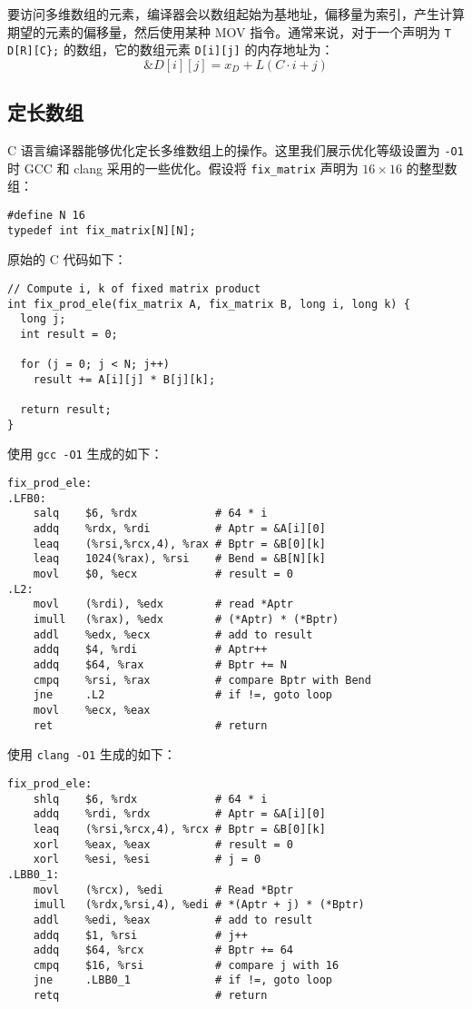 要访问多维数组的元素，编译器会以数组起始为基地址，偏移量为索引，产生计算期望的元素的偏移量，然后使用某种 MOV 指令。通常来说，对于一个声明为 \verb|T D[R][C};| 的数组，它的数组元素 \verb|D[i][j]| 的内存地址为：
\begin{equation}
    \&D[i][j] = x_D + L(C \cdot i + j)
    \label{def:2darray_addr}
\end{equation}

\subsection{定长数组}

C 语言编译器能够优化定长多维数组上的操作。这里我们展示优化等级设置为 \verb|-O1| 时 GCC 和 clang 采用的一些优化。假设将 \verb|fix_matrix| 声明为 $16 \times 16$ 的整型数组：
\begin{verbatim}
#define N 16
typedef int fix_matrix[N][N];
\end{verbatim}

原始的 C 代码如下：
\begin{verbatim}
// Compute i, k of fixed matrix product
int fix_prod_ele(fix_matrix A, fix_matrix B, long i, long k) {
  long j;
  int result = 0;

  for (j = 0; j < N; j++)
    result += A[i][j] * B[j][k];

  return result;
}
\end{verbatim}

使用 \verb|gcc -O1| 生成的如下：
\begin{verbatim}
fix_prod_ele:
.LFB0:
    salq    $6, %rdx            # 64 * i
    addq    %rdx, %rdi          # Aptr = &A[i][0]
    leaq    (%rsi,%rcx,4), %rax # Bptr = &B[0][k]
    leaq    1024(%rax), %rsi    # Bend = &B[N][k]
    movl    $0, %ecx            # result = 0
.L2:
    movl    (%rdi), %edx        # read *Aptr
    imull   (%rax), %edx        # (*Aptr) * (*Bptr)
    addl    %edx, %ecx          # add to result
    addq    $4, %rdi            # Aptr++
    addq    $64, %rax           # Bptr += N
    cmpq    %rsi, %rax          # compare Bptr with Bend
    jne     .L2                 # if !=, goto loop
    movl    %ecx, %eax
    ret                         # return
\end{verbatim}

使用 \verb|clang -O1| 生成的如下：
\begin{verbatim}
fix_prod_ele:
    shlq    $6, %rdx            # 64 * i
    addq    %rdi, %rdx          # Aptr = &A[i][0]
    leaq    (%rsi,%rcx,4), %rcx # Bptr = &B[0][k]
    xorl    %eax, %eax          # result = 0
    xorl    %esi, %esi          # j = 0
.LBB0_1:
    movl    (%rcx), %edi        # Read *Bptr
    imull   (%rdx,%rsi,4), %edi # *(Aptr + j) * (*Bptr)
    addl    %edi, %eax          # add to result
    addq    $1, %rsi            # j++
    addq    $64, %rcx           # Bptr += 64
    cmpq    $16, %rsi           # compare j with 16
    jne     .LBB0_1             # if !=, goto loop
    retq                        # return
\end{verbatim}

